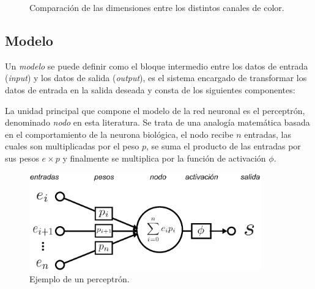 
\begin{figure}[htp]
    \centering
    \qquad
    \caption{Comparación de las dimensiones entre los distintos canales de color.}
\end{figure}

\subsection{Modelo}
Un \emph{modelo} se puede definir como el bloque intermedio entre los datos de entrada (\emph{input}) y los datos de salida (\emph{output}), es el sistema encargado de transformar los datos de entrada en la salida deseada y consta de los siguientes componentes:

La unidad principal que compone el modelo de la red neuronal es el perceptrón, denominado \emph{nodo} en esta literatura. Se trata de una analogía matemática basada en el comportamiento de la neurona biológica, el nodo recibe $n$ entradas, las cuales son multiplicadas por el peso $p$, se suma el producto de las entradas por sus pesos $ e \times p$ y finalmente se multiplica por la función de activación $\phi$. 

\begin{figure}[b]
    \includegraphics[width=100mm]{Figuras/neural_network.eps}
    \centering
    \caption{Ejemplo de un perceptrón.}
    \label{fig:percep}
\end{figure}


